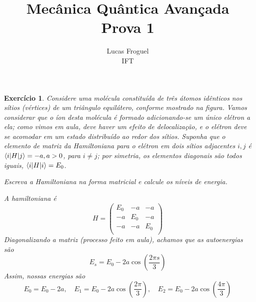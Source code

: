 \documentclass[12pt]{article}
\title{Mecânica Quântica Avançada \\ Prova 1}
\author{Lucas Froguel \\ IFT}
\date{}
\def\be{\begin{equation}}
\def\ee{\end{equation}}
\def\f{\frac}
\def\l{\left}
\def\r{\right}
\newtheorem{exercise}{Exercício}
\begin{document}
	\maketitle
	\listoftheorems[title={Prova 1}]

	\begin{exercise}
		Considere uma molécula constituída de três átomos idênticos nos
		sítios (vértices) de um triângulo equilátero, conforme mostrado na figura. Vamos considerar que o íon desta molécula é formado adicionando-se um único elétron a ela; como vimos em aula, deve haver um efeito de delocalização, e o elétron deve se acomodar em um estado distribuído ao redor dos sítios. Suponha que o elemento de matriz da Hamiltoniana para o elétron em dois sítios adjacentes $i, j$ é $\braket{i|H|j} = -a, a>0$, para $i\not=j$; por simetria, os elementos diagonais são todos	iguais, $\braket{i|H|i}=E_0$.
		\begin{exercises}
			\item Escreva a Hamiltoniana na forma matricial e calcule os níveis de energia.
			\begin{multianswer}
				A hamiltoniana é
				\be
					H = 
					\begin{pmatrix}
						E_0 & -a & -a \\
						-a & E_0 & -a \\
						-a & -a & E_0 \\
					\end{pmatrix}
				\ee
				Diagonalizando a matriz (processo feito em aula), achamos que as autoenergias são
				\be
					E_s = E_0 -2a\cos\l( \f{2\pi s}{3}\r)
				\ee
				Assim, nossas energias são
				\be
					E_0 = E_0 - 2a, \quad E_1 = E_0 -2a\cos\l(\f{2\pi}{3}\r), \quad E_2 = E_0 -2a\cos\l(\f{4\pi}{3}\r)
				\ee
			\end{multianswer}
			

\end{exercises}
\end{exercise}
\end{document}
